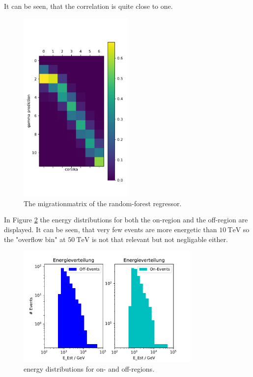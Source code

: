 It can be seen, that the correlation is quite close to one.
\begin{figure}[H]
  \centering
  \includegraphics[width=0.5\textwidth]{plots/Matrix.pdf}
  \caption{The migrationmatrix of the random-forest regressor.}
  \label{fig:matrix}
\end{figure}

In Figure \ref{fig:Edist} the energy distributions for both the on-region and the off-region are displayed.
It can be seen, that very few events are more energetic than $\SI{10}{\tera\electronvolt}$ so the
"overflow bin" at $\SI{50}{\tera\electronvolt}$ is not that relevant but not negligable either.

\begin{figure}[H]
  \centering
  \includegraphics[width=0.8\textwidth]{plots/E_verteilung.pdf}
  \caption{energy distributions for on- and off-regions.}
  \label{fig:Edist}
\end{figure}

